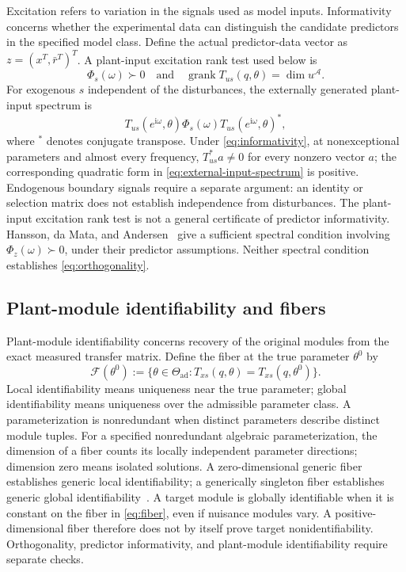 \documentclass[11pt,a4paper]{article}
\newcommand{\grank}{\operatorname{grank}}
\newcommand{\specmat}[1]{\Phi_{#1}}
\newcommand{\fiber}{\mathcal F}
\newcommand{\Aset}{\mathcal A}
\begin{document}
Excitation refers to variation in the signals used as model inputs.  Informativity concerns whether the experimental data can distinguish the candidate predictors in the specified model class.  Define the actual predictor-data vector as $z=(x^T,\bar r^T)^T$.  A plant-input excitation rank test used below is
\begin{equation}
  \specmat{s}(\omega) \succ 0
  \quad\text{and}\quad
  \grank T_{u s}(q,\theta)=\dim u^{\Aset}.
  \label{eq:informativity}
\end{equation}
For exogenous $s$ independent of the disturbances, the externally generated plant-input spectrum is
\begin{equation}
  T_{us}(e^{\mathrm i\omega},\theta)\specmat{s}(\omega)
  T_{us}(e^{\mathrm i\omega},\theta)^* ,
  \label{eq:external-input-spectrum}
\end{equation}
where $^*$ denotes conjugate transpose.  Under \eqref{eq:informativity}, at nonexceptional parameters and almost every frequency, $T_{us}^*a\ne0$ for every nonzero vector $a$; the corresponding quadratic form in \eqref{eq:external-input-spectrum} is positive.  Endogenous boundary signals require a separate argument: an identity or selection matrix does not establish independence from disturbances.  The plant-input excitation rank test is not a general certificate of predictor informativity.  Hansson, da Mata, and Andersen~\cite{HanssonDaMataAndersen2026} give a sufficient spectral condition involving $\specmat{z}(\omega)\succ0$, under their predictor assumptions.  Neither spectral condition establishes \eqref{eq:orthogonality}.

\subsection{Plant-module identifiability and fibers}
\label{sec:fiber-definitions}

Plant-module identifiability concerns recovery of the original modules from the exact measured transfer matrix.  Define the fiber at the true parameter $\theta^0$ by
\begin{equation}
  \fiber(\theta^0)
  :=\{\theta\in\Theta_{\mathrm{ad}}:T_{xs}(q,\theta)=T_{xs}(q,\theta^0)\}.
  \label{eq:fiber}
\end{equation}
Local identifiability means uniqueness near the true parameter; global identifiability means uniqueness over the admissible parameter class.  A parameterization is nonredundant when distinct parameters describe distinct module tuples.  For a specified nonredundant algebraic parameterization, the dimension of a fiber counts its locally independent parameter directions; dimension zero means isolated solutions.  A zero-dimensional generic fiber establishes generic local identifiability; a generically singleton fiber establishes generic global identifiability~\cite{HanssonDaMataAndersen2026}.  A target module is globally identifiable when it is constant on the fiber in \eqref{eq:fiber}, even if nuisance modules vary.  A positive-dimensional fiber therefore does not by itself prove target nonidentifiability.  Orthogonality, predictor informativity, and plant-module identifiability require separate checks.
\end{document}
